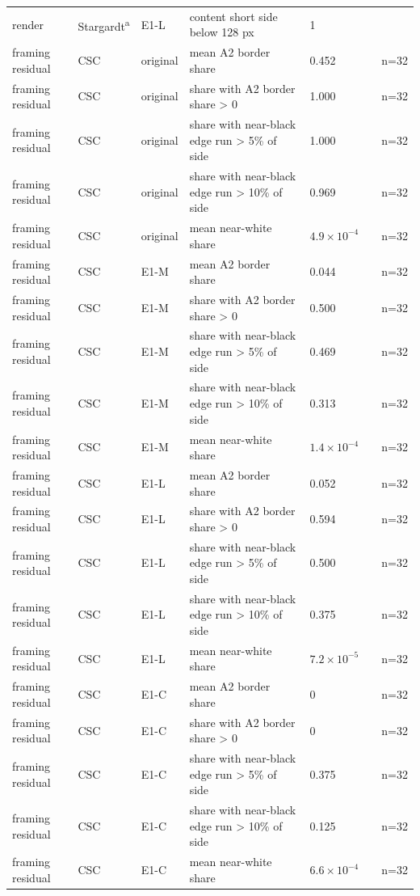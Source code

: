 \begin{longtable}{@{}p{3.3cm}lp{1.5cm}p{3.6cm}p{2.2cm}p{1.6cm}p{3.2cm}@{}}
render & Stargardt\textsuperscript{a} & E1-L & content short side below 128 px & 1 &  &  \\
framing residual & CSC & original & mean A2 border share & 0.452 &  & n=32 \\
framing residual & CSC & original & share with A2 border share > 0 & 1.000 &  & n=32 \\
framing residual & CSC & original & share with near-black edge run > 5\% of side & 1.000 &  & n=32 \\
framing residual & CSC & original & share with near-black edge run > 10\% of side & 0.969 &  & n=32 \\
framing residual & CSC & original & mean near-white share & $4.9\times10^{-4}$ &  & n=32 \\
framing residual & CSC & E1-M & mean A2 border share & 0.044 &  & n=32 \\
framing residual & CSC & E1-M & share with A2 border share > 0 & 0.500 &  & n=32 \\
framing residual & CSC & E1-M & share with near-black edge run > 5\% of side & 0.469 &  & n=32 \\
framing residual & CSC & E1-M & share with near-black edge run > 10\% of side & 0.313 &  & n=32 \\
framing residual & CSC & E1-M & mean near-white share & $1.4\times10^{-4}$ &  & n=32 \\
framing residual & CSC & E1-L & mean A2 border share & 0.052 &  & n=32 \\
framing residual & CSC & E1-L & share with A2 border share > 0 & 0.594 &  & n=32 \\
framing residual & CSC & E1-L & share with near-black edge run > 5\% of side & 0.500 &  & n=32 \\
framing residual & CSC & E1-L & share with near-black edge run > 10\% of side & 0.375 &  & n=32 \\
framing residual & CSC & E1-L & mean near-white share & $7.2\times10^{-5}$ &  & n=32 \\
framing residual & CSC & E1-C & mean A2 border share & 0 &  & n=32 \\
framing residual & CSC & E1-C & share with A2 border share > 0 & 0 &  & n=32 \\
framing residual & CSC & E1-C & share with near-black edge run > 5\% of side & 0.375 &  & n=32 \\
framing residual & CSC & E1-C & share with near-black edge run > 10\% of side & 0.125 &  & n=32 \\
framing residual & CSC & E1-C & mean near-white share & $6.6\times10^{-4}$ &  & n=32 \\

\end{longtable}
